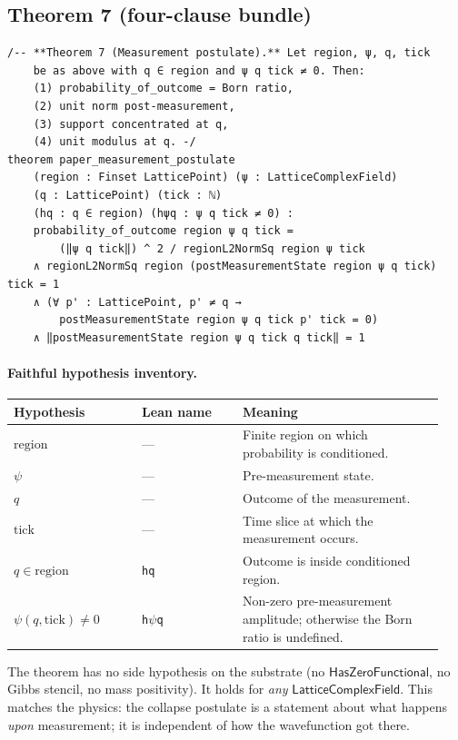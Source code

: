\documentclass[11pt,a4paper,twoside]{article}
\theoremstyle{definition}
\newcommand{\HasZF}{\mathsf{HasZeroFunctional}}
\newcommand{\Lfield}{\mathsf{LatticeComplexField}}
\newcommand{\code}[1]{\texttt{#1}}
\begin{document}
\subsection{Theorem 7 (four-clause bundle)}\label{sec:T7}

\begin{lstlisting}
/-- **Theorem 7 (Measurement postulate).** Let region, ψ, q, tick
    be as above with q ∈ region and ψ q tick ≠ 0. Then:
    (1) probability_of_outcome = Born ratio,
    (2) unit norm post-measurement,
    (3) support concentrated at q,
    (4) unit modulus at q. -/
theorem paper_measurement_postulate
    (region : Finset LatticePoint) (ψ : LatticeComplexField)
    (q : LatticePoint) (tick : ℕ)
    (hq : q ∈ region) (hψq : ψ q tick ≠ 0) :
    probability_of_outcome region ψ q tick =
        (‖ψ q tick‖) ^ 2 / regionL2NormSq region ψ tick
    ∧ regionL2NormSq region (postMeasurementState region ψ q tick) tick = 1
    ∧ (∀ p' : LatticePoint, p' ≠ q →
        postMeasurementState region ψ q tick p' tick = 0)
    ∧ ‖postMeasurementState region ψ q tick q tick‖ = 1
\end{lstlisting}

\paragraph{Faithful hypothesis inventory.}

\begin{longtable}{@{}p{0.28\linewidth} p{0.22\linewidth} p{0.44\linewidth}@{}}
\toprule
Hypothesis & Lean name & Meaning \\
\midrule
\endhead
$\mathrm{region}$ & --- & Finite region on which probability is conditioned. \\
$\psi$ & --- & Pre-measurement state. \\
$q$ & --- & Outcome of the measurement. \\
$\mathrm{tick}$ & --- & Time slice at which the measurement occurs. \\
$q\in\mathrm{region}$ & \code{hq} & Outcome is inside conditioned region. \\
$\psi(q,\mathrm{tick})\ne 0$ & \code{h$\psi$q} & Non-zero pre-measurement amplitude; otherwise the Born ratio is undefined. \\
\bottomrule
\end{longtable}

\noindent The theorem has no side hypothesis on the substrate (no
$\HasZF$, no Gibbs stencil, no mass positivity). It holds for
\emph{any} $\Lfield$. This matches the physics: the collapse
postulate is a statement about what happens \emph{upon} measurement;
it is independent of how the wavefunction got there.
\end{document}
